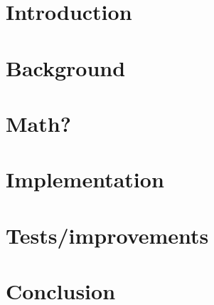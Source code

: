 \documentclass[runningheads,a4paper,11pt]{report}
\begin{document}

\begin{abstract}

\end{abstract}

\tableofcontents

\chapter{Introduction}
\label{sec:intro}


\chapter{Background}
\label{sec:background}


\chapter{Math?}

\chapter{Implementation}


\chapter{Tests/improvements}


\chapter{Conclusion}
\label{sec:conclusion}

\end{document}
